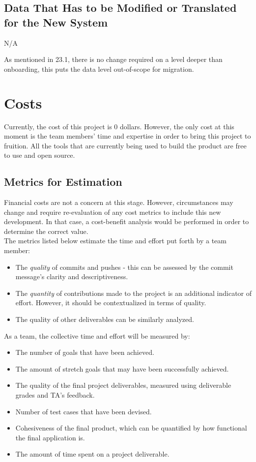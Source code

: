 \documentclass[12pt]{article}
\begin{document}
\subsection{Data That Has to be Modified or Translated for the New System}
N/A

As mentioned in 23.1, there is no change required on a level deeper than onboarding, this puts the data level out-of-scope for migration.


\section{Costs}
Currently, the cost of this project is 0 dollars. However, the only cost at this moment is the team members' time and expertise in order to bring this project to fruition. All the tools that are currently being used to build the product are free to use and open source.
\subsection{Metrics for Estimation}
Financial costs are not a concern at this stage. However, circumstances may change and require re-evaluation of any cost metrics to include this new development. In that case, a cost-benefit analysis would be performed in order to determine the correct value. \\
The metrics listed below estimate the time and effort put forth by a team member:
\begin{itemize}
  \item The \textit{quality} of commits and pushes - this can be assessed by the commit message’s clarity and descriptiveness.
  \item The \textit{quantity} of contributions made to the project is an additional indicator of effort. However, it should be contextualized in terms of quality. 
  \item The quality of other deliverables can be similarly analyzed. 
\end{itemize}
As a team, the collective time and effort will be measured by:
\begin{itemize}
  \item The number of goals that have been achieved.
  \item The amount of stretch goals that may have been successfully achieved.
  \item The quality of the final project deliverables, measured using deliverable grades and TA’s feedback.
  \item Number of test cases that have been devised.
  \item Cohesiveness of the final product, which can be quantified by how functional the final application is.
  \item The amount of time spent on a project deliverable.
\end{itemize}
\end{document}
